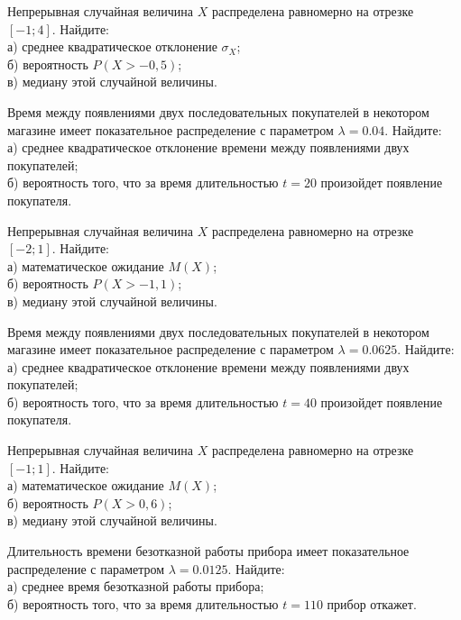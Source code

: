 \z Непрерывная случайная величина $X$ распределена равномерно на отрезке $[-1; 4]$. Найдите: \\ \quad а) среднее квадратическое отклонение $\sigma_X$; \\ \quad б) вероятность $P(X>-0{,}5)$; \\ \quad в) медиану этой случайной величины.


\vfill

\z Время между появлениями двух последовательных покупателей в некотором магазине имеет показательное распределение с параметром $\lambda = 0.04$. Найдите: \\ \quad а) среднее квадратическое отклонение времени между появлениями двух покупателей; \\ \quad б) вероятность того, что за время длительностью $t = 20$  произойдет появление покупателя.
 

\vfill

\newpage\setcounter{zad}{0}

\z Непрерывная случайная величина $X$ распределена равномерно на отрезке $[-2; 1]$. Найдите: \\ \quad а) математическое ожидание $M(X)$; \\ \quad б) вероятность $P(X>-1{,}1)$; \\ \quad в) медиану этой случайной величины.


\vfill

\z Время между появлениями двух последовательных покупателей в некотором магазине имеет показательное распределение с параметром $\lambda = 0.0625$. Найдите: \\ \quad а) среднее квадратическое отклонение времени между появлениями двух покупателей; \\ \quad б) вероятность того, что за время длительностью $t = 40$  произойдет появление покупателя.
 

\vfill

\newpage\setcounter{zad}{0}

\z Непрерывная случайная величина $X$ распределена равномерно на отрезке $[-1; 1]$. Найдите: \\ \quad а) математическое ожидание $M(X)$; \\ \quad б) вероятность $P(X>0{,}6)$; \\ \quad в) медиану этой случайной величины.


\vfill

\z Длительность времени безотказной работы прибора имеет показательное распределение с параметром $\lambda = 0.0125$. Найдите: \\ \quad а) среднее время безотказной работы прибора; \\ \quad б) вероятность того, что за время длительностью $t = 110$ прибор  откажет.
 

